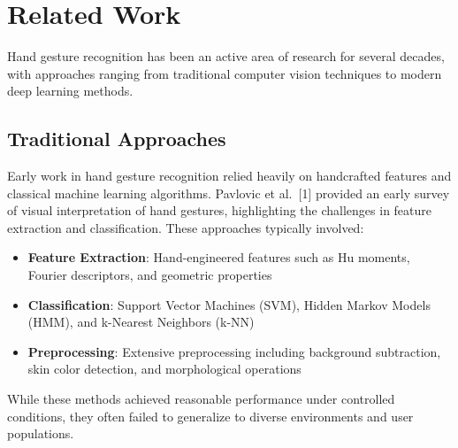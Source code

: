 \documentclass[11pt,a4paper,twoside]{article}
\providecommand{\tightlist}{%
  \setlength{\itemsep}{0pt}\setlength{\parskip}{0pt}}
\begin{document}
\section{Related Work}\label{ii.-related-work}

\begin{center}
\end{center}

\vspace{0.5cm}

Hand gesture recognition has been an active area of research for several
decades, with approaches ranging from traditional computer vision
techniques to modern deep learning methods.

\subsection{Traditional Approaches}\label{a.-traditional-approaches}

\begin{center}
\colorbox{blue!5}{%
\begin{minipage}{0.9\textwidth}
\vspace{0.3cm}

Early work in hand gesture recognition relied heavily on handcrafted
features and classical machine learning algorithms. Pavlovic et
al.~{[}1{]} provided an early survey of visual interpretation of hand
gestures, highlighting the challenges in feature extraction and
classification. These approaches typically involved:

\begin{itemize}
\tightlist
\item
  \textbf{Feature Extraction}: Hand-engineered features such as Hu
  moments, Fourier descriptors, and geometric properties
\item
  \textbf{Classification}: Support Vector Machines (SVM), Hidden Markov
  Models (HMM), and k-Nearest Neighbors (k-NN)
\item
  \textbf{Preprocessing}: Extensive preprocessing including background
  subtraction, skin color detection, and morphological operations
\end{itemize}

While these methods achieved reasonable performance under controlled
conditions, they often failed to generalize to diverse environments and
user populations.

\vspace{0.3cm}
\end{minipage}
}
\end{center}
\end{document}
